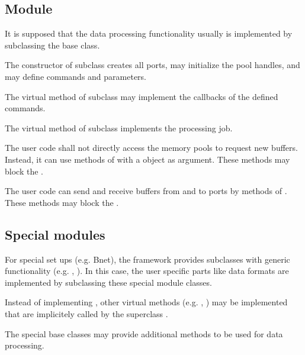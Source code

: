 \subsection{Module}
It is supposed that the data processing functionality usually is implemented by subclassing 
   the  base class. 
\bcir
\item  The constructor of  subclass  creates all 
      ports, may initialize the pool handles, and may 
      define commands and parameters. 
\item  The virtual  method of  
      subclass may implement the callbacks of the defined commands.
\item  The virtual  method of  
      subclass implements the processing job.
\item  The user code shall not directly access the 
      memory pools to request new buffers. Instead, it can use methods of 
       with a  object as argument. 
      These methods may block the .
\item  The user code can send and receive buffers 
      from and to ports by methods of . 
      These methods may block the .
\ecir
\subsection{Special modules}
For special set ups (e.g. Bnet), the framework provides 
    subclasses with generic functionality 
   (e.g. , ). 
   In this case, the user specific parts like data formats are 
   implemented by subclassing these special module classes.
\begin{compactitem}[$\circ$]
\item  Instead of implementing , other virtual 
      methods (e.g. , ) may be 
      implemented that are implicitely called by the superclass .
\item  The special base classes may provide additional 
      methods to be used for data processing.    
\end{compactitem}
